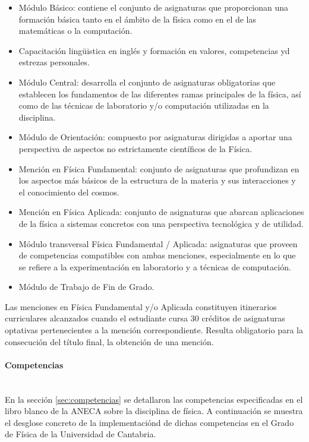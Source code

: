 \begin{itemize}
    \item Módulo Básico: contiene el conjunto de asignaturas que proporcionan una formación básica tanto en el ámbito de la física como en el de las matemáticas o la computación.
    \item Capacitación lingüistica en inglés y formación en valores, competencias yd estrezas personales.
    \item Módulo Central: desarrolla el conjunto de asignaturas obligatorias que establecen los fundamentos de las diferentes ramas principales de la física, así como de las técnicas de laboratorio y/o computación utilizadas en la disciplina.
    \item Módulo de Orientación: compuesto por asignaturas dirigidas a aportar una perspectiva de aspectos no estrictamente científicos de la Física.
    \item Mención en Física Fundamental: conjunto de asignaturas que profundizan en los aspectos más básicos de la estructura de la materia y sus interacciones y el conocimiento del cosmos.
    \item Mención en Física Aplicada: conjunto de asignaturas que abarcan aplicaciones de la física a sistemas concretos con una perspectiva tecnológica y de utilidad.
    \item Módulo transversal Física Fundamental / Aplicada: asignaturas que proveen de competencias compatibles con ambas menciones, especialmente en lo que se refiere a la experimentación en laboratorio y a técnicas de computación.
    \item Módulo de Trabajo de Fin de Grado.
\end{itemize}

Las menciones en Física Fundamental y/o Aplicada constituyen itinerarios curriculares alcanzados cuando el estudiante cursa 30 créditos de asignaturas optativas pertenecientes a la mención correspondiente. Resulta obligatorio para la consecución del título final, la obtención de una mención.  


\paragraph{Competencias\\\\}

En la sección \ref{sec:competencias} se detallaron las competencias especificadas en el libro blanco de la ANECA sobre la disciplina de física. A continuación se muestra el desglose concreto de la implementaciónd de dichas competencias en el Grado de Física de la Universidad de Cantabria.

